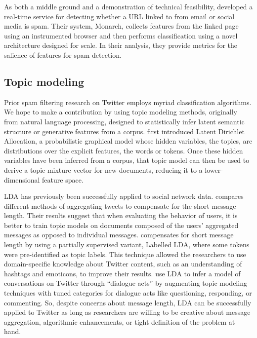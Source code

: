 \documentclass[times, 11pt, twocolumn]{article}
\begin{document}
As both a middle ground and a demonstration of technical feasibility, \cite{Thomas2011} developed a real-time service for detecting whether a URL linked to from email or social media is spam. Their system, Monarch, collects features from the linked page using an instrumented browser and then performs classification using a novel architecture designed for scale. In their analysis, they provide metrics for the salience of features for spam detection.

\subsection{Topic modeling}
Prior spam filtering research on Twitter employs myriad classification algorithms. We hope to make a contribution by using topic modeling methods, originally from natural language processing, designed to statistically infer latent semantic structure or generative features from a corpus. \cite{Blei2003} first introduced Latent Dirichlet Allocation, a probabilistic graphical model whose hidden variables, the topics, are distributions over the explicit features, the words or tokens. Once these hidden variables have been inferred from a corpus, that topic model can then be used to derive a topic mixture vector for new documents, reducing it to a lower-dimensional feature space.

LDA has previously been successfully applied to social network data. \cite{Hong2010} compares different methods of aggregating tweets to compensate for the short message length. Their results suggest that when evaluating the behavior of users, it is better to train topic models on documents composed of the users' aggregated messages as opposed to individual messages. \cite{Ramage2010} compensates for short message length by using a partially supervised variant, Labelled LDA, where some tokens were pre-identified as topic labels. This technique allowed the researchers to use domain-specific knowledge about Twitter content, such as an understanding of hashtags and emoticons, to improve their results. \cite{Ritter2010} use LDA to infer a model of conversations on Twitter through ``dialogue acts'' by augmenting topic modeling techniques with tuned categories for dialogue acts like questioning, responding, or commenting. So, despite concerns about message length, LDA can be successfully applied to Twitter as long as researchers are willing to be creative about message aggregation, algorithmic enhancements, or tight definition of the problem at hand.
\end{document}
